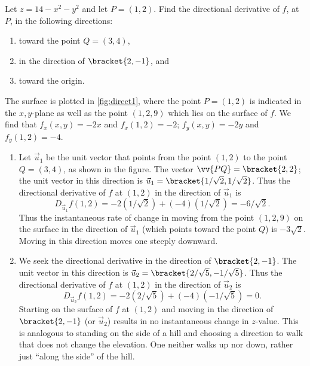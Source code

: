 \begin{example}\label{ex_direct1}
Let $z= 14-x^2-y^2$ and let $P=(1,2)$. Find the directional derivative of $f$, at $P$, in the following directions:
\begin{enumerate}
	\item toward the point $Q=(3,4)$,
	\item	in the direction of $\bracket{2,-1}$, and
	\item toward the origin.
\end{enumerate}
\solution
{}
The surface is plotted in \autoref{fig:direct1}, where the point $P=(1,2)$ is indicated in the $x,y$-plane as well as the point $(1,2,9)$ which lies on the surface of $f$. We find that $f_x(x,y) = -2x$ and $f_x(1,2) = -2$; $f_y(x,y) = -2y$ and $f_y(1,2) = -4$. 
\begin{enumerate}
	\item Let $\vec u_1$ be the unit vector that points from the point $(1,2)$ to the point $Q=(3,4)$, as shown in the figure. The vector $\vv{PQ} =\bracket{2,2}$; the unit vector in this direction is $\vec u_1=\bracket{1/\sqrt{2}, 1/\sqrt{2}}$. Thus the directional derivative of $f$ at $(1,2)$ in the direction of $\vec u_1$ is
	\[D_{\vec u_1}f(1,2) = -2(1/\sqrt{2}) +(-4)(1/\sqrt{2}) = -6/\sqrt{2}%
	.\]
	Thus the instantaneous rate of change in moving from the point $(1,2,9)$ on the surface in the direction of $\vec u_1$ (which points toward the point $Q$) is $-3\sqrt2$. Moving in this direction moves one steeply downward.
	
	\item		We seek the directional derivative in the direction of $\bracket{2,-1}$. The unit vector in this direction is $\vec u_2 =\bracket{2/\sqrt{5},-1/\sqrt{5}}$. Thus the directional derivative of $f$ at $(1,2)$ in the direction of $\vec u_2$ is
	\[D_{\vec u_2}f(1,2) = -2(2/\sqrt{5})+(-4)(-1/\sqrt{5}) = 0.\]
	Starting on the surface of $f$ at $(1,2)$ and moving in the direction of $\bracket{2,-1}$ (or $\vec u_2$) results in no instantaneous change in $z$-value. This is analogous to standing on the side of a hill and choosing a direction to walk that does not change the elevation. One neither walks up nor down, rather just ``along the side'' of the hill.
	

\end{enumerate}
\end{example}
